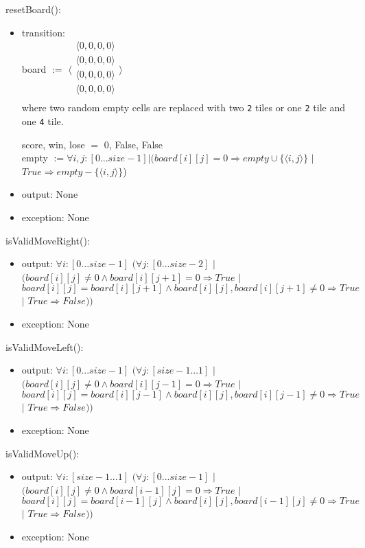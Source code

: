 \documentclass[12pt]{article}
\begin{document}
\noindent resetBoard():
\begin{itemize}
\item transition:\\
      board $:=$ 
      $\langle \begin{array}{c}
      \langle 0, 0, 0, 0 \rangle\\
      \langle 0, 0, 0, 0 \rangle\\
      \langle 0, 0, 0, 0 \rangle\\
      \langle 0, 0, 0, 0 \rangle\\
      \end{array} \rangle$ \\ 
      where two random empty cells are replaced with two \texttt{2} tiles or one \texttt{2} tile and one \texttt{4} tile.

      score, win, lose $=$ 0, False, False\\
      empty $:= \forall i, j : [0...size-1] | (board[i][j] = 0 \Rightarrow empty \cup \{\langle i, j \rangle\}$ $|$ $True \Rightarrow empty - \{\langle i, j \rangle\}$)
\item output: None
\item exception: None
\end{itemize}

\noindent isValidMoveRight():
\begin{itemize}
\item output: $\forall i : [0...size-1]$ $(\forall j : [0...size-2]$ $|$ $(board[i][j] \ne 0 \land board[i][j+1]=0 \Rightarrow True$ $|$ $board[i][j] = board[i][j+1] \land board[i][j], board[i][j+1] \ne 0 \Rightarrow True$ $|$ $True \Rightarrow False))$
\item exception: None
\end{itemize}

\noindent isValidMoveLeft():
\begin{itemize}
\item output: $\forall i : [0...size-1]$ $(\forall j : [size-1...1]$ $|$ $(board[i][j] \ne 0 \land board[i][j-1]=0 \Rightarrow True$ $|$ $board[i][j] = board[i][j-1] \land board[i][j], board[i][j-1] \ne 0 \Rightarrow True$ $|$ $True \Rightarrow False))$
\item exception: None
\end{itemize}

\noindent isValidMoveUp():
\begin{itemize}
\item output: $\forall i : [size-1...1]$ $(\forall j : [0...size-1]$ $|$ $(board[i][j] \ne 0 \land board[i-1][j]=0 \Rightarrow True$ $|$ $board[i][j] = board[i-1][j] \land board[i][j], board[i-1][j] \ne 0 \Rightarrow True$ $|$ $True \Rightarrow False))$
\item exception: None
\end{itemize}
\end{document}
